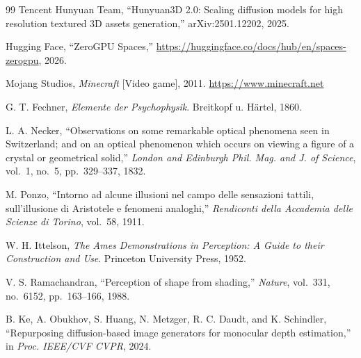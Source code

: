 \documentclass[10pt,twocolumn]{article}
\begin{document}
\begin{thebibliography}{99}
Tencent Hunyuan Team, ``Hunyuan3D 2.0: Scaling diffusion models for high
resolution textured 3D assets generation,'' arXiv:2501.12202, 2025.

Hugging Face, ``ZeroGPU Spaces,''
\url{https://huggingface.co/docs/hub/en/spaces-zerogpu}, 2026.

Mojang Studios, \emph{Minecraft} [Video game], 2011.
\url{https://www.minecraft.net}

G. T. Fechner, \emph{Elemente der Psychophysik}.
Breitkopf u. Härtel, 1860.

L. A. Necker, ``Observations on some remarkable optical phenomena seen in
Switzerland; and on an optical phenomenon which occurs on viewing a figure
of a crystal or geometrical solid,'' \emph{London and Edinburgh Phil. Mag. and
J. of Science}, vol.~1, no.~5, pp.~329--337, 1832.

M. Ponzo, ``Intorno ad alcune illusioni nel campo delle sensazioni tattili,
sull'illusione di Aristotele e fenomeni analoghi,''
\emph{Rendiconti della Accademia delle Scienze di Torino}, vol.~58, 1911.

W. H. Ittelson, \emph{The Ames Demonstrations in Perception: A Guide to their
Construction and Use}. Princeton University Press, 1952.

V. S. Ramachandran, ``Perception of shape from shading,''
\emph{Nature}, vol.~331, no.~6152, pp.~163--166, 1988.

B. Ke, A. Obukhov, S. Huang, N. Metzger, R. C. Daudt, and K. Schindler,
``Repurposing diffusion-based image generators for monocular depth
estimation,'' in \emph{Proc. IEEE/CVF CVPR}, 2024.

\end{thebibliography}

\end{document}
